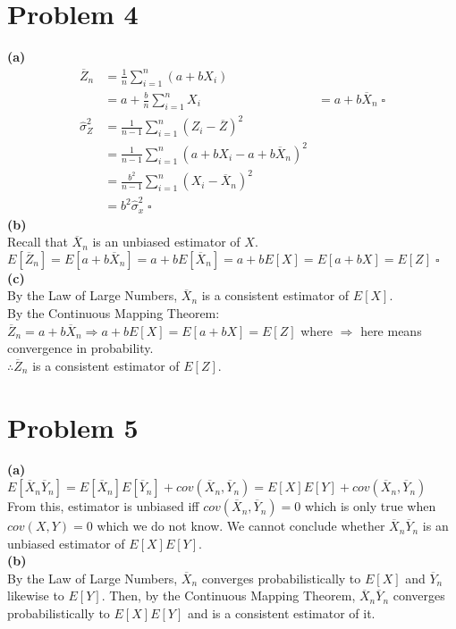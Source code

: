\documentclass[fleqn]{article}
\begin{document}
\begin{adjustwidth}{-2cm}{-2cm}
\section{Problem 4}
\textbf{(a)}
\begin{align*}
\overline{Z}_{n} &= \frac{1}{n}\sum_{i=1}^{n}\left(a+bX_{i}\right)\\
&= a+\frac{b}{n}\sum_{i=1}^{n}X_{i} 
&= a+b\overline{X}_{n} \; \square\\
\hat{\sigma}_{Z}^{2} &= \frac{1}{n-1}\sum_{i=1}^{n}\left(Z_{i}-\overline{Z}\right)^{2}\\ 
&= \frac{1}{n-1}\sum_{i=1}^{n}\left(a+bX_{i}-a+b\overline{X}_{n}\right)^{2}\\
&= \frac{b^{2}}{n-1}\sum_{i=1}^{n}\left(X_{i}-\overline{X}_{n}\right)^{2}\\
&= b^{2}\hat{\sigma}_{x}^{2} \; \square
\end{align*}
\textbf{(b)}\\
Recall that $\overline{X}_{n}$ is an unbiased estimator of $X$.\\
$E\left[\overline{Z}_{n}\right] = E\left[a+b\overline{X}_{n}\right] = a+bE\left[\overline{X}_{n}\right] = a+bE[X] = E[a+bX] = E[Z] \; \square$\\
\textbf{(c)}\\
By the Law of Large Numbers, $\overline{X}_{n}$ is a consistent estimator of $E[X]$.\\
By the Continuous Mapping Theorem:\\
$\overline{Z}_{n} = a+b\overline{X}_{n} \Rightarrow a + bE[X] = E[a+bX] = E[Z]$ where $\Rightarrow$ here means convergence in probability.\\
$\therefore \overline{Z}_{n}$ is a consistent estimator of $E[Z]$.

\section{Problem 5}
\textbf{(a)}\\
$E\left[\overline{X}_{n}\overline{Y}_{n}\right] = E\left[\overline{X}_{n}\right]E\left[\overline{Y}_{n}\right] + cov\left(\overline{X}_{n},\overline{Y}_{n}\right) = E[X]E[Y] + cov\left(\overline{X}_{n},\overline{Y}_{n}\right)$\\
From this, estimator is unbiased iff $cov\left(\overline{X}_{n},\overline{Y}_{n}\right) = 0$ which is only true when $cov(X,Y)=0$ which we do not know. We cannot conclude whether $\overline{X}_{n}\overline{Y}_{n}$ is an unbiased estimator of $E[X]E[Y]$.\\
\textbf{(b)}\\
By the Law of Large Numbers, $\overline{X}_{n}$ converges probabilistically to $E[X]$ and $\overline{Y}_{n}$ likewise to $E[Y]$. Then, by the Continuous Mapping Theorem, $\overline{X}_{n}\overline{Y}_{n}$ converges probabilistically to $E[X]E[Y]$ and is a consistent estimator of it.
\end{adjustwidth}
\end{document}
